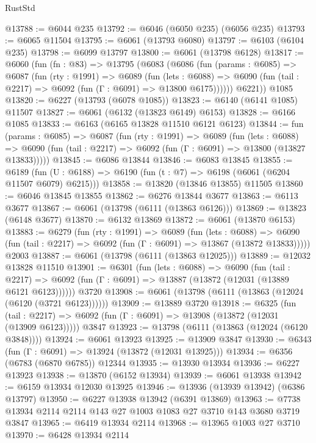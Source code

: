 \begin{lexlean}{RustStd}
\begin{coremodule}
@13788 := @6044 @235
@13792 := @6046 (@6050 @235) (@6056 @235)
@13793 := @6065 @11504
@13795 := @6061 (@13793 @6080)
@13797 := @6103 (@6104 @235)
@13798 := @6099 @13797
@13800 := @6061 (@13798 @6128)
@13817 := @6060
    (fun (fn : @83) =>
    @13795
      (@6083
        (@6086
          (fun (params : @6085) =>
          @6087
            (fun (rty : @1991) =>
            @6089
              (fun (lets : @6088) =>
              @6090 (fun (tail : @2217) => @6092 (fun (Γ : @6091) => @13800 @6175))))))
        @6221))
    @1085
@13820 := @6227 (@13793 (@6078 @1085))
@13823 := @6140 (@6141 @1085) @11507
@13827 := @6061 (@6132 (@13823 @6149) @6153)
@13828 := @6166 @1085
@13833 := @6163 (@6165 @13828 @11510 @6121 @6123)
@13844 := fun (params : @6085) =>
  @6087
    (fun (rty : @1991) =>
    @6089
      (fun (lets : @6088) =>
      @6090 (fun (tail : @2217) => @6092 (fun (Γ : @6091) => @13800 (@13827 @13833)))))
@13845 := @6086 @13844
@13846 := @6083 @13845
@13855 := @6189
    (fun (U : @6188) => @6190 (fun (t : @7) => @6198 (@6061 (@6204 @11507 @6079) @6215)))
@13858 := @13820 (@13846 @13855) @11505
@13860 := @6046 @13845 @13855
@13862 := @6276 @13844 @3677
@13863 := @6113 @3677
@13867 := @6061 (@13798 (@6111 (@13863 @6126)))
@13869 := @13823 (@6148 @3677)
@13870 := @6132 @13869
@13872 := @6061 (@13870 @6153)
@13883 := @6279
    (fun (rty : @1991) =>
    @6089
      (fun (lets : @6088) =>
      @6090 (fun (tail : @2217) => @6092 (fun (Γ : @6091) => @13867 (@13872 @13833)))))
    @2003
@13887 := @6061 (@13798 (@6111 (@13863 @12025)))
@13889 := @12032 @13828 @11510
@13901 := @6301
    (fun (lets : @6088) =>
    @6090
      (fun (tail : @2217) =>
      @6092 (fun (Γ : @6091) => @13887 (@13872 (@12031 (@13889 @6121 @6123))))))
    @3720
@13908 := @6061 (@13798 (@6111 (@13863 (@12024 (@6120 (@3721 @6123))))))
@13909 := @13889 @3720
@13918 := @6325
    (fun (tail : @2217) => @6092 (fun (Γ : @6091) => @13908 (@13872 (@12031 (@13909 @6123)))))
    @3847
@13923 := @13798 (@6111 (@13863 (@12024 (@6120 @3848))))
@13924 := @6061 @13923
@13925 := @13909 @3847
@13930 := @6343 (fun (Γ : @6091) => @13924 (@13872 (@12031 @13925)))
@13934 := @6356 (@6783 (@6870 @6785)) @12344
@13935 := @13930 @13934
@13936 := @6227 @13923
@13938 := @13870 (@6152 @13934)
@13939 := @6061 @13938
@13942 := @6159 @13934 @12030 @13925
@13946 := @13936 (@13939 @13942) (@6386 @13797)
@13950 := @6227 @13938 @13942 (@6391 @13869)
@13963 := @7738 @13934 @2114 @2114 @143 @27 @1003 @1083 @27 @3710 @143 @3680 @3719 @3847
@13965 := @6419 @13934 @2114
@13968 := @13965 @1003 @27 @3710
@13970 := @6428 @13934 @2114

\end{coremodule}
\end{lexlean}
